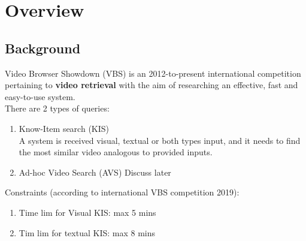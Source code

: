 \section{Overview}
\subsection{Background}
Video Browser Showdown (VBS) is an 2012-to-present international competition pertaining to \textbf{video retrieval} with the aim of researching an effective, fast and easy-to-use system.\\

\noindent There are 2 types of queries:
\begin{enumerate}
	\item Know-Item search (KIS)\\
	A system is received visual, textual or both types input, and it needs to find the most similar video analogous to provided inputs.
	
	\item Ad-hoc Video Search (AVS)
	Discuss later\\
\end{enumerate}

\noindent Constraints (according to international VBS competition 2019):
\begin{enumerate}
	\item Time lim for Visual KIS: max 5 mins
	\item Tim lim for textual KIS: max 8 mins
\end{enumerate}
